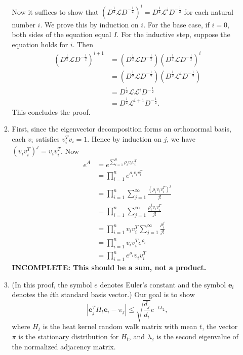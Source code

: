\documentclass{article}
\newcommand{\incomplete}[1]{\textbf{INCOMPLETE: #1}}
\newcommand{\1}{\mathbf{1}}
\newcommand{\0}{\mathbf{0}}
\newcommand{\e}{\mathbf{e}}
\renewcommand{\L}{\mathcal{L}}
\begin{document}
\begin{enumerate}
\begin{enumerate}
    Now it suffices to show that $(D^{\frac{1}{2}} \L D^{-\frac{1}{2}})^i = D^{\frac{1}{2}} \L^i D^{-\frac{1}{2}}$ for each natural number $i$.
    We prove this by induction on $i$.
    For the base case, if $i = 0$, both sides of the equation equal $I$.
    For the inductive step, suppose the equation holds for $i$.
    Then
    \begin{align*}
      (D^{\frac{1}{2}} \L D^{-\frac{1}{2}})^{i + 1} & = (D^{\frac{1}{2}} \L D^{-\frac{1}{2}}) (D^{\frac{1}{2}} \L D^{-\frac{1}{2}})^i \\
      & = (D^{\frac{1}{2}} \L D^{-\frac{1}{2}}) (D^{\frac{1}{2}} \L^i D^{-\frac{1}{2}}) \\
      & = D^{\frac{1}{2}} \L \L^i D^{-\frac{1}{2}} \\
      & = D^{\frac{1}{2}} \L^{i + 1} D^{-\frac{1}{2}}.
    \end{align*}
    This concludes the proof.
  \item
    First, since the eigenvector decomposition forms an orthonormal basis, each $v_i$ satisfies $v_i^T v_i = 1$.
    Hence by induction on $j$, we have $(v_i v_i^T)^j = v_i v_i^T$.
    Now
    \begin{align*}
      e^A & = e^{\sum_{i = 1}^n \rho_i v_i v_i^T} \\
      & = \prod_{i = 1}^n e^{\rho_i v_i v_i^T} \\
      & = \prod_{i = 1}^n \sum_{j = 1}^\infty \frac{(\rho_i v_i v_i^T)^j}{j!} \\
      & = \prod_{i = 1}^n \sum_{j = 1}^\infty \frac{\rho_i^j v_i v_i^T}{j!} \\
      & = \prod_{i = 1}^n v_i v_i^T \sum_{j = 1}^\infty \frac{\rho_i^j}{j!} \\
      & = \prod_{i = 1}^n v_i v_i^T e^{\rho_i} \\
      & = \prod_{i = 1}^n e^{\rho_i} v_i v_i^T
    \end{align*}
    \incomplete{This should be a sum, not a product.}
  \item
    (In this proof, the symbol $e$ denotes Euler's constant and the symbol $\e_i$ denotes the $i$th standard basis vector.)
    Our goal is to show
    \begin{equation*}
      \left|\e_j^T H_t \e_i - \pi_j\right| \leq \sqrt{\frac{d_j}{d_i}} e^{-t \lambda_2},
    \end{equation*}
    where $H_t$ is the heat kernel random walk matrix with mean $t$, the vector $\pi$ is the stationary distribution for $H_t$, and $\lambda_2$ is the second eigenvalue of the normalized adjacency matrix.


\end{enumerate}
\end{enumerate}
\end{document}

